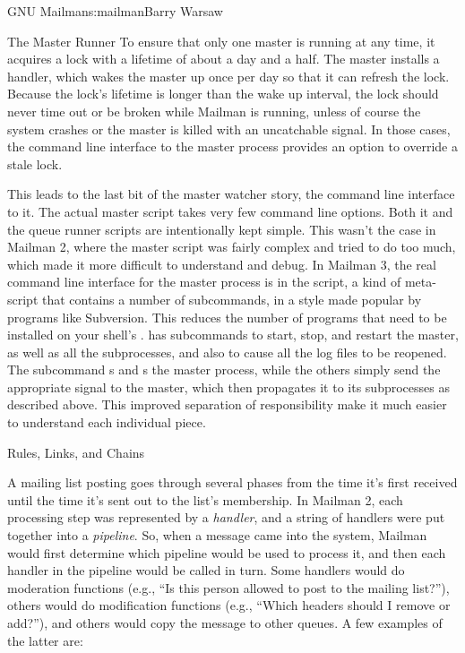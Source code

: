 \begin{aosachapter}{GNU Mailman}{s:mailman}{Barry Warsaw}
\begin{aosasect1}{The Master Runner}
To ensure that only one master is running at any time, it acquires a
lock with a lifetime of about a day and a half.  The master installs a
 handler, which wakes the master up once per day so that
it can refresh the lock.  Because the lock's lifetime is longer than
the wake up interval, the lock should never time out or be broken
while Mailman is running, unless of course the system crashes or the
master is killed with an uncatchable signal.  In those cases, the
command line interface to the master process provides an option to
override a stale lock.

This leads to the last bit of the master watcher story, the command
line interface to it.  The actual master script takes very few command
line options.  Both it and the queue runner scripts are intentionally
kept simple.  This wasn't the case in Mailman 2, where the master
script was fairly complex and tried to do too much, which made it more
difficult to understand and debug.  In Mailman 3, the real command
line interface for the master process is in the 
script, a kind of meta-script that contains a number of subcommands,
in a style made popular by programs like Subversion.  This reduces the
number of programs that need to be installed on your shell's
.   has subcommands to start, stop, and
restart the master, as well as all the subprocesses, and also to cause
all the log files to be reopened.  The  subcommand
s and s the master process, while the others
simply send the appropriate signal to the master, which then
propagates it to its subprocesses as described above.  
This improved separation of responsibility make it much easier to
understand each individual piece.

\end{aosasect1}

\begin{aosasect1}{Rules, Links, and Chains}

A mailing list posting goes through several phases from the time it's
first received until the time it's sent out to the list's membership.
In Mailman 2, each processing step was represented by a
\emph{handler}, and a string of handlers were put together into a
\emph{pipeline}.  So, when a message came into the system, Mailman
would first determine which pipeline would be used to process it, and
then each handler in the pipeline would be called in turn.  Some
handlers would do moderation functions (e.g., ``Is this person allowed
to post to the mailing list?''), others would do modification
functions (e.g., ``Which headers should I remove or add?''), and
others would copy the message to other queues.  A few examples of the
latter are:


\end{aosasect1}
\end{aosachapter}
